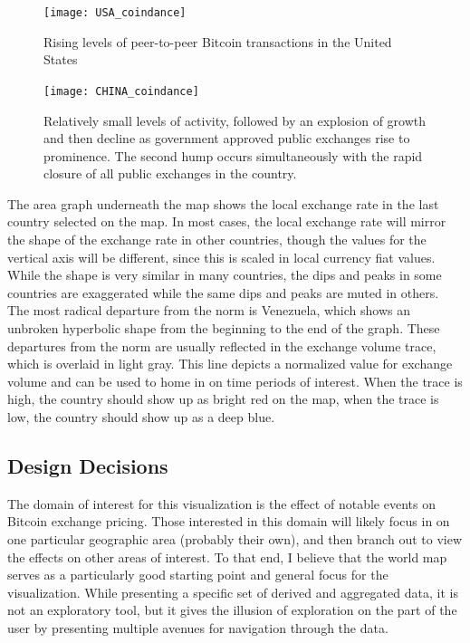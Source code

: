 \documentclass[journal]{vgtc}                %
\begin{document}
\begin{figure}
	\centering
	\texttt{[image: USA\_coindance]}
	\caption{Rising levels of peer-to-peer Bitcoin transactions in the United States\cite{coind-1}}
	\label{fig:usacoindance}
\end{figure}

\begin{figure}
	\centering
	\texttt{[image: CHINA\_coindance]}
	\caption{Relatively small levels of activity, followed by an explosion of growth and then decline as government approved public exchanges rise to prominence.  The second hump occurs simultaneously with the rapid closure of all public exchanges in the country.\cite{coind-1}}
	\label{fig:chinacoindance}
\end{figure}

The area graph underneath the map shows the local exchange rate in the last country selected on the map.  In most cases, the local exchange rate will mirror the shape of the exchange rate in other countries, though the values for the vertical axis will be different, since this is scaled in local currency fiat values.  While the shape is very similar in many countries, the dips and peaks in some countries are exaggerated while the same dips and peaks are muted in others.  The most radical departure from the norm is Venezuela, which shows an unbroken hyperbolic shape from the beginning to the end of the graph.  These departures from the norm are usually reflected in the exchange volume trace, which is overlaid in light gray.  This line depicts a normalized value for exchange volume and can be used to home in on time periods of interest.  When the trace is high, the country should show up as bright red on the map, when the trace is low, the country should show up as a deep blue.

\subsection{Design Decisions}
The domain of interest for this visualization is the effect of notable events on Bitcoin exchange pricing.  Those interested in this domain will likely focus in on one particular geographic area (probably their own), and then branch out to view the effects on other areas of interest.  To that end, I believe that the world map serves as a particularly good starting point and general focus for the visualization.  While presenting a specific set of derived and aggregated data, it is not an exploratory tool, but it gives the illusion of exploration on the part of the user by presenting multiple avenues for navigation through the data.
\end{document}
